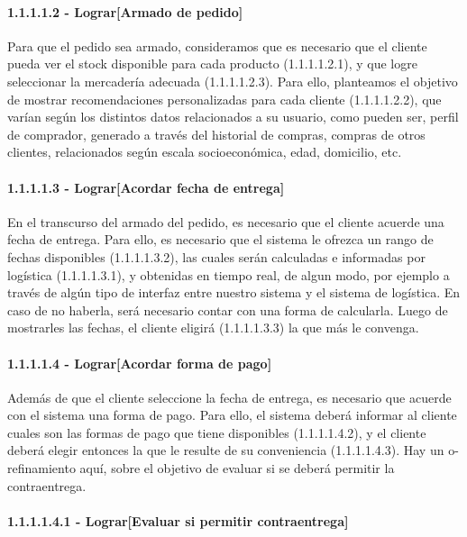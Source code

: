 \paragraph{1.1.1.1.2 - Lograr[Armado de pedido]} \label{para:1.1.1.1.2}

Para que el pedido sea armado, consideramos que es necesario que el cliente
pueda ver el stock disponible para cada producto (1.1.1.1.2.1), y que logre
seleccionar la mercadería adecuada (1.1.1.1.2.3). Para ello, planteamos el
objetivo de mostrar recomendaciones personalizadas para cada cliente
(1.1.1.1.2.2), que varían según los distintos datos relacionados a su usuario,
como pueden ser, perfil de comprador, generado a través del historial de
compras, compras de otros clientes, relacionados según escala socioeconómica,
edad, domicilio, etc.

\paragraph{1.1.1.1.3 - Lograr[Acordar fecha de entrega]} \label{para:1.1.1.1.3}

En el transcurso del armado del pedido, es necesario que el cliente acuerde una
fecha de entrega. Para ello, es necesario que el sistema le ofrezca un rango de
fechas disponibles (1.1.1.1.3.2), las cuales serán calculadas e informadas por
logística (1.1.1.1.3.1), y obtenidas en tiempo real, de algun modo, por ejemplo
a través de algún tipo de interfaz entre nuestro sistema y el sistema de
logística. En caso de no haberla, será necesario contar con una forma de
calcularla. Luego de mostrarles las fechas, el cliente eligirá (1.1.1.1.3.3) la
que más le convenga.

\paragraph{1.1.1.1.4 - Lograr[Acordar forma de pago]} \label{para:1.1.1.1.4}

Además de que el cliente seleccione la fecha de entrega, es necesario que
acuerde con el sistema una forma de pago. Para ello, el sistema deberá informar
al cliente cuales son las formas de pago que tiene disponibles (1.1.1.1.4.2), y
el cliente deberá elegir entonces la que le resulte de su conveniencia
(1.1.1.1.4.3). Hay un o-refinamiento aquí, sobre el objetivo de evaluar si se
deberá permitir la contraentrega.

\paragraph{1.1.1.1.4.1 - Lograr[Evaluar si permitir contraentrega]} \label{para:1.1.1.1.4.1}

